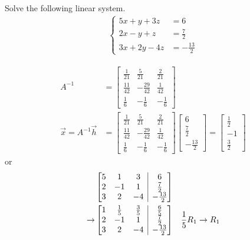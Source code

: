 \begin{Exercise}
Solve the following linear system.
\begin{align*}
\begin{cases}
5x + y + 3z &= 6\\
2x - y + z &= \frac{7}{2}\\
3x + 2y - 4z &= -\frac{13}{2}
\end{cases}
\end{align*}
\end{Exercise}
\begin{Answer}
\begin{align*}
A^{-1} &=
\begin{bmatrix}
\frac{1}{21} & \frac{5}{21} & \frac{2}{21}\\
\frac{11}{42} & -\frac{29}{42} & \frac{1}{42}\\
\frac{1}{6} & -\frac{1}{6} & -\frac{1}{6}
\end{bmatrix} \\
\vec{x} =
A^{-1}\vec{h}
&=
\begin{bmatrix}
\frac{1}{21} & \frac{5}{21} & \frac{2}{21}\\
\frac{11}{42} & -\frac{29}{42} & \frac{1}{42}\\
\frac{1}{6} & -\frac{1}{6} & -\frac{1}{6}
\end{bmatrix}
\begin{bmatrix}
6\\
\frac{7}{2}\\
-\frac{13}{2}
\end{bmatrix}
=
\begin{bmatrix}
\frac{1}{2}\\
-1\\
\frac{3}{2}
\end{bmatrix} 
\end{align*}
or
\begin{align*}
&\left[
\begin{array}{@{}ccc|c@{}}
5 & 1 & 3 & 6\\
2 & -1 & 1 & \frac{7}{2}\\
3 & 2 & -4 & -\frac{13}{2}
\end{array}
\right]\\
\to &
\left[
\begin{array}{@{}ccc|c@{}}
1 & \frac{1}{5} & \frac{3}{5} & \frac{6}{5}\\
2 & -1 & 1 & \frac{7}{2}\\
3 & 2 & -4 & -\frac{13}{2}
\end{array}
\right] & \frac{1}{5}R_1 \rightarrow R_1
\\

\end{align*}
\end{Answer}
